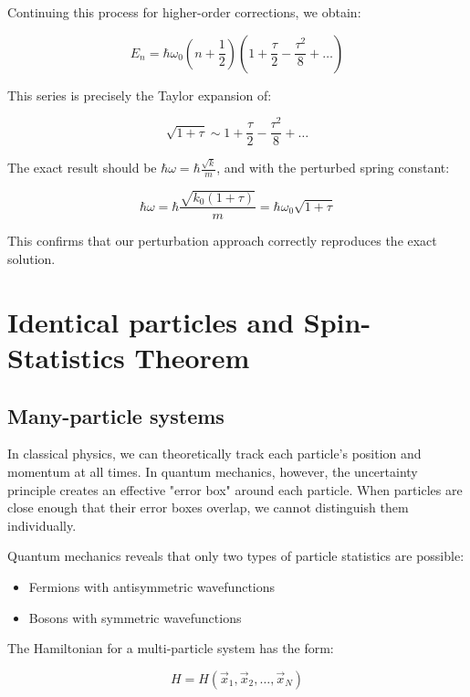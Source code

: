 \documentclass[italian]{HKNdocument}
\begin{document}
Continuing this process for higher-order corrections, we obtain:

\begin{equation}
E_n=\hbar\omega_0(n+\frac{1}{2})(1+\frac{\tau}{2}-\frac{\tau^2}{8}+\ldots) \label{eq:13.28}
\end{equation}

This series is precisely the Taylor expansion of:

\begin{equation}
\sqrt{1+\tau}\sim 1+\frac{\tau}{2}-\frac{\tau^2}{8}+\ldots \label{eq:13.29}
\end{equation}

The exact result should be $\hbar\omega=\hbar\frac{\sqrt{k}}{m}$, and with the perturbed spring constant:

\begin{equation}
\hbar\omega=\hbar\frac{\sqrt{k_0(1+\tau)}}{m}=\hbar\omega_0\sqrt{1+\tau} \label{eq:13.30}
\end{equation}

This confirms that our perturbation approach correctly reproduces the exact solution.

\section{Identical particles and Spin-Statistics Theorem}
\subsection{Many-particle systems}
In classical physics, we can theoretically track each particle's position and momentum at all times. In quantum mechanics, however, the uncertainty principle creates an effective "error box" around each particle. When particles are close enough that their error boxes overlap, we cannot distinguish them individually.

Quantum mechanics reveals that only two types of particle statistics are possible:
\begin{itemize}
  \item Fermions with antisymmetric wavefunctions
  \item Bosons with symmetric wavefunctions
\end{itemize}

The Hamiltonian for a multi-particle system has the form:

\begin{equation}
H=H(\vec{x}_1,\vec{x}_2,\ldots,\vec{x}_N) \label{eq:14.1}
\end{equation}
\end{document}
